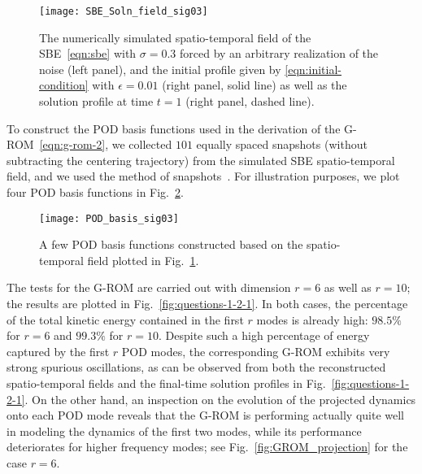 \documentclass[11pt]{amsart}
\numberwithin{equation}{section}
\begin{document}
\begin{figure}[h]
\begin{center}
	\texttt{[image: SBE\_Soln\_field\_sig03]}
	\caption{
		The numerically simulated spatio-temporal field of the SBE~\eqref{eqn:sbe} with $\sigma=0.3$ forced by an arbitrary realization of the noise (left panel), and the initial profile given by \eqref{eqn:initial-condition} with $\epsilon = 0.01$ (right panel, solid line) as well as the solution profile at time $t=1$ (right panel, dashed line).
	}
	\label{fig:numerical-discretization-1} 
	\end{center}
\end{figure}




To construct the POD basis functions used in the derivation of the G-ROM~\eqref{eqn:g-rom-2}, we collected $101$ equally spaced snapshots (without subtracting the centering trajectory) from the simulated SBE spatio-temporal field, and we used the method of snapshots~\cite{Sir87abc}. For illustration purposes, we plot four POD basis functions in Fig.~\ref{fig:numerical-discretization-2}. 


\begin{figure} %
\begin{center}
	\texttt{[image: POD\_basis\_sig03]}
	\caption{A few POD basis functions constructed based on the spatio-temporal field plotted in Fig.~\ref{fig:numerical-discretization-1}.  }
	\label{fig:numerical-discretization-2} 
	\end{center}
\end{figure}


The tests for the G-ROM are carried out with dimension $r=6$ as well as $r=10$; the results are plotted in Fig.~\ref{fig:questions-1-2-1}. In both cases, the percentage of the total kinetic energy contained in the first $r$ modes is already high: $98.5\%$ for $r=6$ and  $99.3\%$ for $r=10$. Despite such a high percentage of energy captured by the first $r$ POD modes, the corresponding G-ROM exhibits very strong spurious oscillations, as can be observed from both the reconstructed spatio-temporal fields and the final-time solution profiles in Fig.~\ref{fig:questions-1-2-1}. On the other hand, an inspection on the evolution of the  projected dynamics onto each POD mode reveals that the G-ROM is performing actually quite well in modeling the dynamics of the first two modes, while its performance deteriorates for higher frequency modes; see Fig.~\ref{fig:GROM_projection} for the case $r=6$. 
\end{document}

